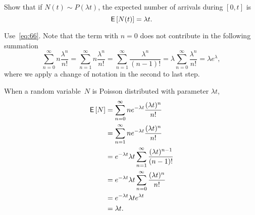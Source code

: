 \begin{exercise}\label{ex:2}
  Show that if $N(t)\sim P(\lambda t)$, the expected number of arrivals during $[0,t]$ is
  \begin{equation*}
  \,\mathsf{E}\left[N(t)\right] = \lambda t.
  \end{equation*}
\begin{hint}
Use~\cref{eq:66}. Note  that the term with $n=0$ does not contribute in the following summation
\begin{equation*}
\sum_{n=0}^\infty n \frac{\lambda^n}{n!} = \sum_{n=1}^\infty n \frac{\lambda^n}{n!} = \sum_{n=1}^\infty \frac{\lambda^n}{(n-1)!} = \lambda \sum_{n=0}^\infty \frac{\lambda^n}{n!} = \lambda e^{\lambda},
\end{equation*}
where we apply a change of notation in the second to last step.
\end{hint}
\begin{solution} 
    When a random variable~$N$ is Poisson distributed with parameter
    $\lambda t$,
    \begin{align*}
      \,\mathsf{E}\left[N\right] 
&= \sum_{n=0}^\infty n e^{-\lambda t}\frac{(\lambda t)^n}{n!}  \\
&= \sum_{n=1}^\infty n e^{-\lambda t}\frac{(\lambda t)^n}{n!} \\ 
&= e^{-\lambda t} \lambda t \sum_{n=1}^\infty \frac{(\lambda t)^{n-1}}{(n-1)!} \\
&= e^{-\lambda t} \lambda t \sum_{n=0}^\infty \frac{(\lambda t)^{n}}{n!} \\
&= e^{-\lambda t} \lambda t e^{\lambda t} \\
&= \lambda t.
    \end{align*}
\end{solution}
\end{exercise}



